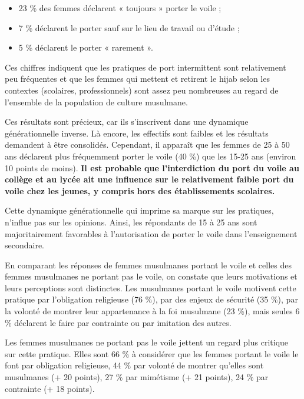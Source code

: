 \begin{itemize}
\item
  
  23 \% des femmes déclarent « toujours » porter le voile ;
  
\item
  
  7 \% déclarent le porter sauf sur le lieu de travail ou d'étude ;
  
\item
  
  5 \% déclarent le porter « rarement ».
  
\end{itemize}


Ces chiffres indiquent que les pratiques de port intermittent sont
relativement peu fréquentes et que les femmes qui mettent et retirent le
hijab selon les contextes (scolaires, professionnels) sont assez peu
nombreuses au regard de l'ensemble de la population de culture
musulmane.

Ces résultats sont précieux, car ils s'inscrivent dans une dynamique
générationnelle inverse. Là encore, les effectifs sont faibles et les
résultats demandent à être consolidés. Cependant, il apparaît que les
femmes de 25 à 50 ans déclarent plus fréquemment porter le voile (40 \%)
que les 15-25 ans (environ 10 points de moins). \textbf{Il est probable
que l'interdiction du port du voile au collège et au lycée ait une
influence sur le relativement faible port du voile chez les jeunes, y
compris hors des établissements scolaires.}


Cette dynamique générationnelle qui imprime sa marque sur les pratiques,
n'influe pas sur les opinions. Ainsi, les répondants de 15 à 25 ans sont
majoritairement favorables à l'autorisation de porter le voile dans
l'enseignement secondaire.


En comparant les réponses de femmes musulmanes portant le voile et
celles des femmes musulmanes ne portant pas le voile, on constate que
leurs motivations et leurs perceptions sont distinctes. Les musulmanes
portant le voile motivent cette pratique par l'obligation religieuse (76
\%), par des enjeux de sécurité (35 \%), par la volonté de montrer leur
appartenance à la foi musulmane (23 \%), mais seules 6 \% déclarent le
faire par contrainte ou par imitation des autres.

Les femmes musulmanes ne portant pas le voile jettent un regard plus
critique sur cette pratique. Elles sont 66 \% à considérer que les
femmes portant le voile le font par obligation religieuse, 44 \% par
volonté de montrer qu'elles sont musulmanes (+ 20 points), 27 \% par
mimétisme (+ 21 points), 24 \% par contrainte (+ 18 points).

